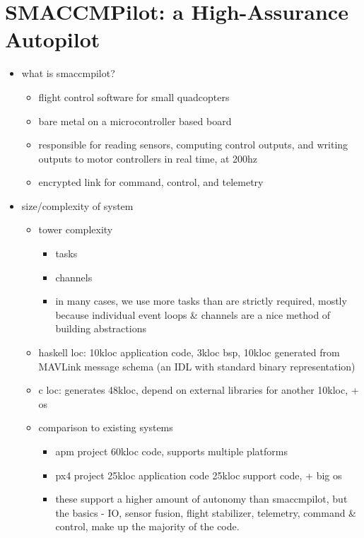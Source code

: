 \section{SMACCMPilot: a High-Assurance Autopilot}

\begin{itemize}
	\item what is smaccmpilot?
		\begin{itemize}
			\item flight control software for small quadcopters
			\item bare metal on a microcontroller based board
			\item responsible for reading sensors, computing control
				outputs, and writing outputs to motor
				controllers in real time, at 200hz
			\item encrypted link for command, control, and telemetry
		\end{itemize}
	\item size/complexity of system
		\begin{itemize}
			\item tower complexity
				\begin{itemize}
					\item tasks
					\item channels
					\item in many cases, we use more tasks
						than are strictly required,
						mostly because individual event
						loops \& channels are a nice
						method of building abstractions
				\end{itemize}
			\item haskell loc: 10kloc application code, 3kloc bsp,
				10kloc generated from MAVLink message schema (an
				IDL with standard binary representation)
			\item c loc: generates 48kloc, depend on external
				libraries for another 10kloc, + os
			\item comparison to existing systems
				\begin{itemize}
					\item apm project
						60kloc code, supports multiple
						platforms
					\item px4 project
						25kloc application code
						25kloc support code, + big os
					\item these support a higher amount of
						autonomy than smaccmpilot, but
						the basics - IO, sensor fusion,
						flight stabilizer, telemetry,
						command \& control, make up the
						majority of the code.
				\end{itemize}
		\end{itemize}
\end{itemize}
